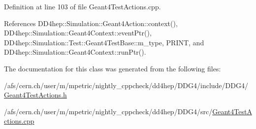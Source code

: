 Definition at line 103 of file Geant4TestActions.cpp.

References DD4hep::Simulation::Geant4Action::context(), DD4hep::Simulation::Geant4Context::eventPtr(), DD4hep::Simulation::Test::Geant4TestBase::m\_\-type, PRINT, and DD4hep::Simulation::Geant4Context::runPtr().

The documentation for this class was generated from the following files:\begin{DoxyCompactItemize}
\item 
/afs/cern.ch/user/m/mpetric/nightly\_\-cppcheck/dd4hep/DDG4/include/DDG4/\hyperlink{_geant4_test_actions_8h}{Geant4TestActions.h}\item 
/afs/cern.ch/user/m/mpetric/nightly\_\-cppcheck/dd4hep/DDG4/src/\hyperlink{_geant4_test_actions_8cpp}{Geant4TestActions.cpp}\end{DoxyCompactItemize}
